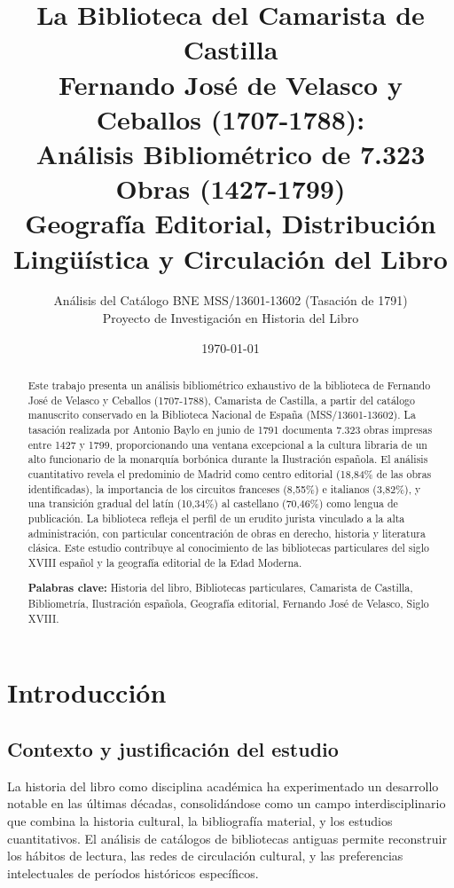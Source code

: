 \documentclass[12pt,a4paper]{article}
\title{
    {\Large\textbf{La Biblioteca del Camarista de Castilla}}\\
    {\Large\textbf{Fernando José de Velasco y Ceballos (1707-1788):}}\\[0.5cm]
    {\large Análisis Bibliométrico de 7.323 Obras (1427-1799)}\\
    {\large Geografía Editorial, Distribución Lingüística y Circulación del Libro}
}
\author{
    Análisis del Catálogo BNE MSS/13601-13602 (Tasación de 1791)\\[0.3cm]
    {\small Proyecto de Investigación en Historia del Libro}
}
\date{\today}
\begin{document}
\maketitle

\begin{abstract}
Este trabajo presenta un análisis bibliométrico exhaustivo de la biblioteca de Fernando José de Velasco y Ceballos (1707-1788), Camarista de Castilla, a partir del catálogo manuscrito conservado en la Biblioteca Nacional de España (MSS/13601-13602). La tasación realizada por Antonio Baylo en junio de 1791 documenta 7.323 obras impresas entre 1427 y 1799, proporcionando una ventana excepcional a la cultura libraria de un alto funcionario de la monarquía borbónica durante la Ilustración española. El análisis cuantitativo revela el predominio de Madrid como centro editorial (18,84\% de las obras identificadas), la importancia de los circuitos franceses (8,55\%) e italianos (3,82\%), y una transición gradual del latín (10,34\%) al castellano (70,46\%) como lengua de publicación. La biblioteca refleja el perfil de un erudito jurista vinculado a la alta administración, con particular concentración de obras en derecho, historia y literatura clásica. Este estudio contribuye al conocimiento de las bibliotecas particulares del siglo XVIII español y la geografía editorial de la Edad Moderna.

\medskip

\noindent\textbf{Palabras clave:} Historia del libro, Bibliotecas particulares, Camarista de Castilla, Bibliometría, Ilustración española, Geografía editorial, Fernando José de Velasco, Siglo XVIII.
\end{abstract}

\newpage

\tableofcontents

\newpage

\section{Introducción}

\subsection{Contexto y justificación del estudio}

La historia del libro como disciplina académica ha experimentado un desarrollo notable en las últimas décadas, consolidándose como un campo interdisciplinario que combina la historia cultural, la bibliografía material, y los estudios cuantitativos. El análisis de catálogos de bibliotecas antiguas permite reconstruir los hábitos de lectura, las redes de circulación cultural, y las preferencias intelectuales de períodos históricos específicos.
\end{document}
